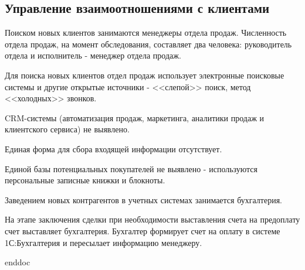%

\subsection{Управление взаимоотношениями с клиентами}
\label{BP_CRM}

Поиском новых клиентов занимаются менеджеры отдела продаж.
Численность отдела продаж, на момент обследования, составляет два человека: руководитель отдела и исполнитель - менеджер отдела продаж.

Для поиска новых клиентов отдел продаж использует электронные поисковые системы и другие открытые источники - <<слепой>> поиск, метод <<холодных>> звонков.

CRM-системы (автоматизация продаж, маркетинга, аналитики продаж и клиентского сервиса) не выявлено. 

Единая форма для сбора входящей информации отсутствует.

Единой базы потенциальных покупателей не выявлено - используются персональные записные книжки и блокноты.

Заведением новых контрагентов в учетных системах занимается бухгалтерия.

На этапе заключения сделки при необходимости выставления счета на предоплату счет выставляет бухгалтерия. Бухгалтер формирует счет на оплату в системе 1С:Бухгалтерия и пересылает информацию менеджеру.




\clearpage
 {enddoc} 